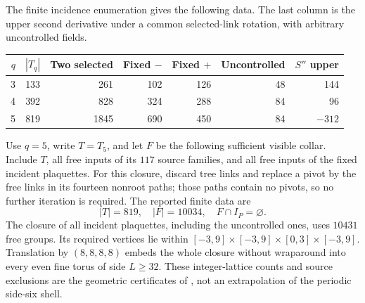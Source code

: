 \documentclass[11pt,oneside,openany]{book}
\theoremstyle{definition}
\theoremstyle{remark}
\newcommand{\src}[2]{\cite[#2]{#1}}
\begin{document}
The finite incidence enumeration gives the following data. The last
column is the upper second derivative under a common selected-link
rotation, with arbitrary uncontrolled fields.
\begin{center}\small
\begin{tabular}{rrrrrrr}
\toprule
$q$ & $|T_q|$ & Two selected & Fixed $-$ & Fixed $+$ & Uncontrolled & $S''$ upper\\
\midrule
3 &133&261&102&126&48&144\\
4 &392&828&324&288&84&96\\
5 &819&1845&690&450&84&$-312$\\
\bottomrule
\end{tabular}
\end{center}
Use $q=5$, write $T=T_5$, and let $F$ be the following sufficient
visible collar. Include $T$, all free inputs of its $117$ source
families, and all free inputs of the fixed incident plaquettes. For
this closure, discard tree links and replace a pivot by the free
links in its fourteen nonroot paths; those paths contain no pivots,
so no further iteration is required. The reported finite data are
\begin{equation}\label{eq:shell-collar-data}
 |T|=819,\quad |F|=10034,\quad F\cap I_P=\varnothing.
\end{equation}
The closure of all incident plaquettes, including the uncontrolled
ones, uses $10431$ free groups. Its required vertices lie within
$[-3,9]\times[-3,9]\times[0,3]\times[-3,9]$. Translation by
$(8,8,8,8)$ embeds the whole closure without wraparound into every
even fine torus of side $L\ge32$. These integer-lattice counts and
source exclusions are the geometric certificates of
\src{F13}{V14}, not an extrapolation of the periodic side-six shell.
\end{document}
